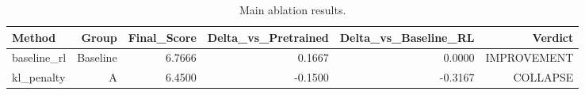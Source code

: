 \begin{table}[htbp]
\centering
\caption{Main ablation results.}
\label{tab:main_results}
\begin{tabular}{lrrrrr}
\toprule
\textbf{Method} & \textbf{Group} & \textbf{Final_Score} & \textbf{Delta_vs_Pretrained} & \textbf{Delta_vs_Baseline_RL} & \textbf{Verdict} \\
\midrule
baseline_rl & Baseline & 6.7666 & 0.1667 & 0.0000 & IMPROVEMENT \\
kl_penalty & A & 6.4500 & -0.1500 & -0.3167 & COLLAPSE \\
\bottomrule
\end{tabular}
\end{table}